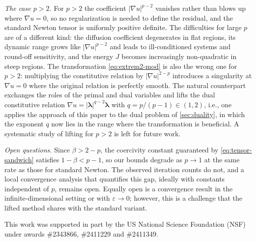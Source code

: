 \documentclass[11pt,pdflatex,sn-mathphys-num]{sn-jnl}
\theoremstyle{thmstyleone}%
\theoremstyle{thmstyletwo}%
\theoremstyle{thmstylethree}%
\newcommand{\bs}[1]{\ensuremath{\boldsymbol{#1}}}
\begin{document}
\noindent
\emph{The case $p>2$.}
For $p>2$ the coefficient $|\nabla u|^{p-2}$ vanishes rather than blows up where $\nabla u=0$, so
no regularization is needed to define the residual, and the standard
Newton tensor
is uniformly positive definite.  The
difficulties for large $p$ are of a different kind: the diffusion
coefficient degenerates in flat regions, its dynamic range grows like
$|\nabla u|^{p-2}$ and leads to ill-conditioned systems and round-off
sensitivity, and the energy $J$ becomes increasingly non-quadratic in
steep regions.
The transformation \eqref{eq:extrem2-mod} is also the wrong one for $p>2$:
multiplying the constitutive relation by $|\nabla u|^{2-p}$ introduces
a singularity at $\nabla u=0$ where the original relation is perfectly
smooth.  The natural counterpart exchanges the roles of the primal and
dual variables and lifts the dual constitutive relation
$\nabla u=|\bs\lambda|^{q-2}\bs\lambda$ with $q=p/(p-1)\in(1,2)$, i.e.,
one applies the approach of this paper to the dual problem of
\cref{sec:duality}, in which the exponent $q$ now lies in the range
where the transformation is beneficial.
A systematic study of
lifting for $p>2$ is left for
future work.

\noindent
\emph{Open questions.}
Since $\beta>2-p$, the coercivity constant guaranteed by
\eqref{eq:tensor-sandwich} satisfies $1-\beta<p-1$, so our bounds
degrade as $p\to 1$ at the same rate as those for standard Newton.  The
observed iteration counts do not, and a local convergence analysis
that quantifies this gap, ideally with constants independent of $p$, remains open.  Equally open is a convergence result in the
infinite-dimensional setting or with $\varepsilon\to0$; however, this is a challenge that the lifted method shares with the standard variant.



This work was supported in part by the US National Science Foundation (NSF) under awards \#2343866, \#2411229 and \#2411349.

\nocite{snbibopts}


 



\appendix
\end{document}
